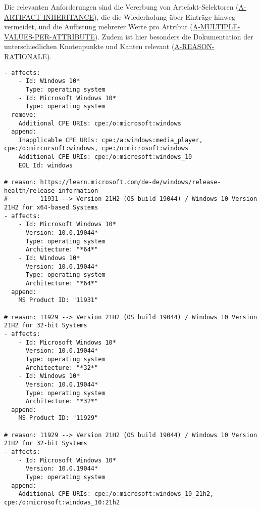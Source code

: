 Die relevanten Anforderungen sind die Vererbung von Artefakt-Selektoren (\hyperref[subsec:req-selektor-inheritance]{A-ARTIFACT-INHERITANCE}), die die Wiederholung über Einträge hinweg vermeidet, und die Auflistung mehrerer Werte pro Attribut (\hyperref[subsec:req-multiple-attribute-values]{A-MULTIPLE-VALUES-PER-ATTRIBUTE}).
Zudem ist hier besonders die Dokumentation der unterschiedlichen Knotenpunkte und Kanten relevant (\hyperref[subsec:req-reason-format]{A-REASON-RATIONALE}).

\begin{lstlisting}[style=yaml,caption={Windows-Korrelation mit mehreren Identifikatoren},label={lst:reference-case-windows},basicstyle=\ttfamily\scriptsize]
- affects:
    - Id: Windows 10*
      Type: operating system
    - Id: Microsoft Windows 10*
      Type: operating system
  remove:
    Additional CPE URIs: cpe:/o:microsoft:windows
  append:
    Inapplicable CPE URIs: cpe:/a:windows:media_player, cpe:/o:mircorsoft:windows, cpe:/o:microsoft:windows
    Additional CPE URIs: cpe:/o:microsoft:windows_10
    EOL Id: windows

# reason: https://learn.microsoft.com/de-de/windows/release-health/release-information
#         11931 --> Version 21H2 (OS build 19044) / Windows 10 Version 21H2 for x64-based Systems
- affects:
    - Id: Microsoft Windows 10*
      Version: 10.0.19044*
      Type: operating system
      Architecture: "*64*"
    - Id: Windows 10*
      Version: 10.0.19044*
      Type: operating system
      Architecture: "*64*"
  append:
    MS Product ID: "11931"

# reason: 11929 --> Version 21H2 (OS build 19044) / Windows 10 Version 21H2 for 32-bit Systems
- affects:
    - Id: Microsoft Windows 10*
      Version: 10.0.19044*
      Type: operating system
      Architecture: "*32*"
    - Id: Windows 10*
      Version: 10.0.19044*
      Type: operating system
      Architecture: "*32*"
  append:
    MS Product ID: "11929"

# reason: 11929 --> Version 21H2 (OS build 19044) / Windows 10 Version 21H2 for 32-bit Systems
- affects:
    - Id: Microsoft Windows 10*
      Version: 10.0.19044*
      Type: operating system
  append:
    Additional CPE URIs: cpe:/o:microsoft:windows_10_21h2, cpe:/o:microsoft:windows_10:21h2
\end{lstlisting}

